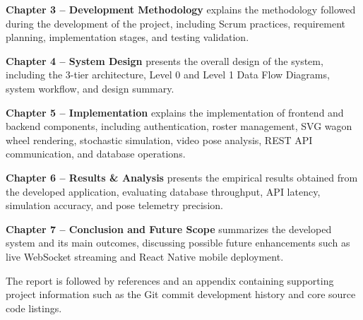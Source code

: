 \textbf{Chapter 3 -- Development Methodology} explains the methodology followed during the development of the project, including Scrum practices, requirement planning, implementation stages, and testing validation.

\textbf{Chapter 4 -- System Design} presents the overall design of the system, including the 3-tier architecture, Level 0 and Level 1 Data Flow Diagrams, system workflow, and design summary.

\textbf{Chapter 5 -- Implementation} explains the implementation of frontend and backend components, including authentication, roster management, SVG wagon wheel rendering, stochastic simulation, video pose analysis, REST API communication, and database operations.

\textbf{Chapter 6 -- Results \& Analysis} presents the empirical results obtained from the developed application, evaluating database throughput, API latency, simulation accuracy, and pose telemetry precision.

\textbf{Chapter 7 -- Conclusion and Future Scope} summarizes the developed system and its main outcomes, discussing possible future enhancements such as live WebSocket streaming and React Native mobile deployment.

The report is followed by references and an appendix containing supporting project information such as the Git commit development history and core source code listings.
